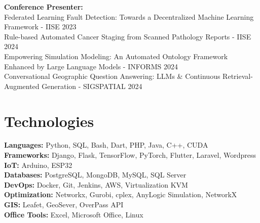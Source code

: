 \documentclass[10pt, letterpaper]{article}
\begin{document}
\vspace{0.5cm}
\textbf{Conference Presenter:}\\
Federated Learning Fault Detection: Towards a Decentralized Machine Learning Framework - IISE 2023\\
\vspace{0.3cm}
Rule-based Automated Cancer Staging from Scanned Pathology Reports - IISE 2024\\
\vspace{0.3cm}
Empowering Simulation Modeling: An Automated Ontology Framework Enhanced by Large Language Models - INFORMS 2024\\
\vspace{0.3cm}
Conversational Geographic Question Answering: LLMs \& Continuous Retrieval-Augmented Generation - SIGSPATIAL 2024\\
\vspace{0.3cm}

\section*{Technologies}
\begin{multicols}{2}
    \textbf{Languages:} Python, SQL, Bash, Dart, PHP, Java, C++, CUDA \\
    \textbf{Frameworks:} Django, Flask, TensorFlow, PyTorch, Flutter, Laravel, Wordpress \\
    \textbf{IoT:} Arduino, ESP32 \\
    \textbf{Databases:} PostgreSQL, MongoDB, MySQL, SQL Server \\
    \textbf{DevOps:} Docker, Git, Jenkins, AWS, Virtualization KVM \\
    \textbf{Optimization:} Networkx, Gurobi, cplex, AnyLogic Simulation, NetworkX \\
    \textbf{GIS:} Leafet, GeoSever, OverPass API \\
    \textbf{Office Tools:} Excel, Microsoft Office, Linux
\end{multicols}

    
\end{document}
